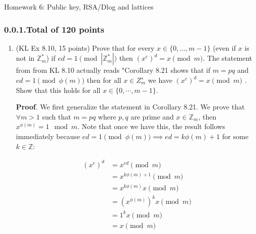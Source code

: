 \documentclass{article}
\begin{document}
\noindent{}Homework 6: Public key, RSA/Dlog and lattices%
\newcommand{\zo}{\{0,1\}}
\newcommand{\E}{\mathbb{E}}
\newcommand{\Z}{\mathbb{Z}}
\newcommand{\getsr}{\leftarrow_R\;}
\newcommand{\Gp}{\mathbb{G}}
\newcommand{\iprod}[1]{\langle #1 \rangle}
\subsubsection{0.0.1.\hspace*{0.5em}Total of 120 points}\label{sec-total-of-120-points}%

\begin{enumerate}%

\item{}
(KL Ex 8.10, 15 points) Prove that for every $x\in \{0,\ldots, m-1\}$ (even if $x$ is not in $\Z^*_m$) if $ed = 1 \pmod{|\Z^*_m|}$ then $(x^e)^d = x \pmod{m}$.
The statement from from KL 8.10 actually reads "Corollary 8.21 shows that if $m = pq$ and $ed = 1 \pmod{\phi(m)}$
then for all $x \in Z^∗_m$ we have $(x^e)^d = x \pmod{m}$ . Show that this holds for all
$x \in \{0,\cdots, m - 1\}$.%

\begin{mdbmarginx}{1ex}{0pt}{1ex}{0pt}%
\noindent{}\textbf{Proof}.  We first generalize the statement in Corollary 8.21. We prove that $\forall m > 1$ such 
that $m = pq$ where $p,q$ are prime and $x \in \Z_m$,
then $x^{\phi(m)} = 1 \mod m$. Note that once we have this, the result follows immediately because 
$ed = 1 \pmod {\phi(m)} \implies ed = k\phi(m) + 1$ for some $k \in \Z$:%
\end{mdbmarginx}%
\noindent\noindent\[%
\begin{aligned}
(x^e)^d &= x^{ed} \pmod{m} \\
&= x^{k\phi(m) + 1} \pmod{m}\\
&=  x^{k\phi(m)}x \pmod{m}\\
&= (x^{\phi(m)})^kx\pmod{m} \\
&= 1^kx \pmod{m}\\
&= x \pmod{m}
\end{aligned}
\]%


\end{enumerate}
\end{document}
